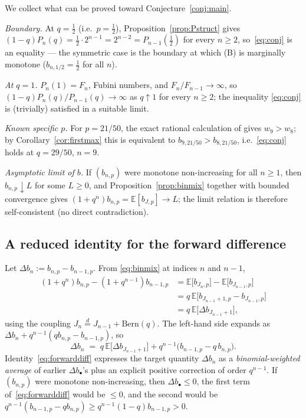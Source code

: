 \documentclass{article}
\theoremstyle{definition}
\theoremstyle{remark}
\begin{document}
We collect what can be proved toward Conjecture~\ref{conj:main}.

\emph{Boundary.} At $q=\tfrac12$ (i.e.\ $p=\tfrac12$),
Proposition~\ref{prop:Pstruct} gives
$(1-q)P_{n}(q)=\tfrac12\cdot 2^{n-1}=2^{n-2}=P_{n-1}(\tfrac12)$ for every
$n\ge 2$, so~\eqref{eq:conj} is an equality — the symmetric case is the
boundary at which (B) is marginally monotone ($b_{n,1/2}=\tfrac12$ for
all $n$).

\emph{At $q=1$.} $P_{n}(1)=F_{n}$, Fubini numbers, and $F_{n}/F_{n-1}\to\infty$,
so $(1-q)P_{n}(q)/P_{n-1}(q)\to\infty$ as $q\uparrow 1$ for every
$n\ge 2$; the inequality \eqref{eq:conj} is (trivially) satisfied in a
suitable limit.

\emph{Known specific $p$.} For $p=21/50$, the exact rational calculation
of \cite{proof_p042} gives $w_{9}>w_{8}$; by Corollary~\ref{cor:firstmax}
this is equivalent to $b_{9,21/50}>b_{8,21/50}$, i.e.~\eqref{eq:conj}
holds at $q=29/50$, $n=9$.

\emph{Asymptotic limit of $b$.} If $(b_{n,p})$ were monotone
non-increasing for all $n\ge 1$, then $b_{n,p}\downarrow L$ for some
$L\ge 0$, and Proposition~\ref{prop:binmix} together with bounded
convergence gives $(1+q^{n})b_{n,p}=\mathbb E[b_{J,p}]\to L$; the limit
relation is therefore self-consistent (no direct contradiction).

\subsection*{A reduced identity for the forward difference}

Let $\Delta b_{n}:=b_{n,p}-b_{n-1,p}$. From \eqref{eq:binmix} at indices
$n$ and $n-1$,
\begin{align*}
  (1+q^{n})b_{n,p}-(1+q^{n-1})b_{n-1,p}
  &=\mathbb E\bigl[b_{J_{n},p}\bigr]-\mathbb E\bigl[b_{J_{n-1},p}\bigr]\\
  &=q\,\mathbb E\bigl[b_{J_{n-1}+1,p}-b_{J_{n-1},p}\bigr]\\
  &=q\,\mathbb E\bigl[\Delta b_{J_{n-1}+1}\bigr],
\end{align*}
using the coupling $J_{n}\stackrel{d}{=}J_{n-1}+\mathrm{Bern}(q)$. The
left-hand side expands as $\Delta b_{n}+q^{n-1}(qb_{n,p}-b_{n-1,p})$, so
\begin{equation}\label{eq:forwarddiff}
  \boxed{\;\Delta b_{n}
  \;=\;q\,\mathbb E\bigl[\Delta b_{J_{n-1}+1}\bigr]
  +q^{n-1}\bigl(b_{n-1,p}-q\,b_{n,p}\bigr).\;}
\end{equation}
Identity~\eqref{eq:forwarddiff} expresses the target quantity
$\Delta b_{n}$ as a \emph{binomial-weighted average} of earlier
$\Delta b_{\bullet}$'s plus an explicit positive correction of order
$q^{n-1}$. If $(b_{n,p})$ were monotone non-increasing, then
$\Delta b_{\bullet}\le 0$, the first term of~\eqref{eq:forwarddiff}
would be $\le 0$, and the second would be
$q^{n-1}(b_{n-1,p}-qb_{n,p})\ge q^{n-1}(1-q)b_{n-1,p}>0$.
\end{document}
